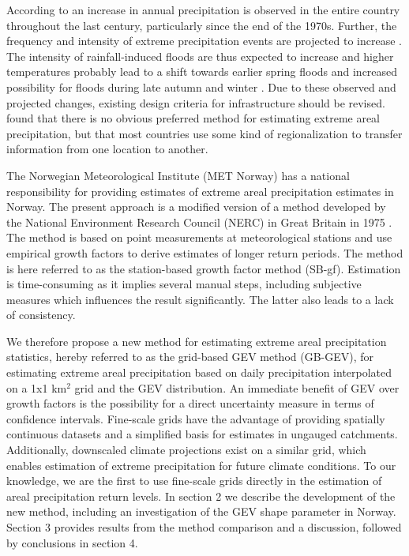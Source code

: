 \documentclass[12pt,a4paper,english]{article}
\begin{document}
According to \cite{Hanssen-Baueretal2009} an increase in annual precipitation is observed in the entire country throughout the last century, particularly since the end of the 1970s. Further, the frequency and intensity of extreme precipitation events are projected to increase \citep{Hanssen-Baueretal2009,SREX2012}. The intensity of rainfall-induced floods are thus expected to increase and higher temperatures probably lead to a shift towards earlier spring floods and increased possibility for floods during late autumn and winter \citep{Wilsonetal2010, Hanssen-Baueretal2009, Hisdaletal2006}. Due to these observed and projected changes, existing design criteria for infrastructure should be revised. \cite{SvenssonandJones2010a} found that there is no obvious preferred method for estimating extreme areal precipitation, but that most countries use some kind of regionalization to transfer information from one location to another. 

The Norwegian Meteorological Institute (MET Norway) has a national responsibility for providing estimates of extreme areal precipitation estimates in Norway. The present approach \citep{ForlandandKristoffersen1989, Forland1992} is a modified version of a method developed by the National Environment Research Council (NERC) in Great Britain in 1975 \citep{NERC1975}. The method is based on point measurements at meteorological stations and use empirical growth factors to derive estimates of longer return periods. The method is here referred to as the station-based growth factor method (SB-gf). Estimation is time-consuming as it implies several manual steps, including subjective measures which influences the result significantly. The latter also leads to a lack of consistency. 

We therefore propose a new method for estimating extreme areal precipitation statistics, hereby referred to as the grid-based GEV method (GB-GEV), for estimating extreme areal precipitation based on daily precipitation interpolated on a 1x1 km$^2$ grid \citep{Tveitoetal2005, Mohr2009, Janssonetal2007} and the GEV distribution. An immediate benefit of GEV over growth factors is the possibility for a direct uncertainty measure in terms of confidence intervals. Fine-scale grids have the advantage of providing spatially continuous datasets and a simplified basis for estimates in ungauged catchments. Additionally, downscaled climate projections exist on a similar grid, which enables estimation of extreme precipitation for future climate conditions. To our knowledge, we are the first to use fine-scale grids directly in the estimation of areal precipitation return levels. %
In section 2 we describe the development of the new method, including an investigation of the GEV shape parameter in Norway. Section 3 provides results from the method comparison and a discussion, followed by conclusions in section 4.
\end{document}
